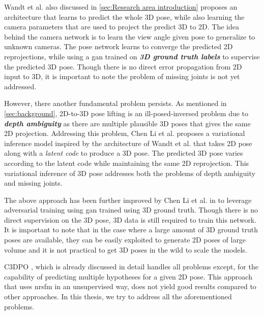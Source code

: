 Wandt et al. \cite{repnet} also discussed in \ref{sec:Research area introduction} proposes an architecture that learns to predict the whole 3D pose, while also learning the camera parameters that are used to project the predict 3D to 2D. The idea behind the camera network is to learn the view angle given pose to generalize to unknown cameras. The pose network learns to converge the predicted 2D reprojections, while using a \ac{gan} trained on \textit{\textbf{3D ground truth labels}} to supervise the predicted 3D pose. Though there is no direct error propagation from 2D input to 3D, it is important to note the problem of missing joints is not yet addressed. 

However, there another fundamental problem persists. As mentioned in \ref{sec:background}, 2D-to-3D pose lifting is an ill-posed-inversed problem due to \textit{\textbf{depth ambiguity}} as there are multiple plausible 3D poses that gives the same 2D projection. Addressing this problem, Chen Li et al. \cite{multiplehypo} proposes a variational inference model inspired by the architecture of Wandt et al. \cite{repnet} that takes 2D pose along with a \textit{latent code} to produce a 3D pose. The predicted 3D pose varies according to the latent code while maintaining the same 2D reprojection. This variational inference of 3D pose addresses both the problems of depth ambiguity and missing joints. 

The above approach has been further improved by Chen Li et al. in \cite{weaklymultiple} to leverage adversarial training using \ac{gan} trained using 3D ground truth. Though there is no direct supervision on the 3D pose, 3D data is still required to train this network. It is important to note that in the case where a large amount of 3D ground truth poses are available, they can be easily exploited to generate 2D poses of large volume and it is not practical to get 3D poses in the wild to scale the models.

C3DPO \cite{c3dpo}, which is already discussed in detail handles all problems except, for the capability of predicting multiple hypotheses for a given 2D pose. This approach that uses \ac{nrsfm} in an unsupervised way, does not yield good results compared to other approaches. In this thesis, we try to address all the aforementioned problems.
